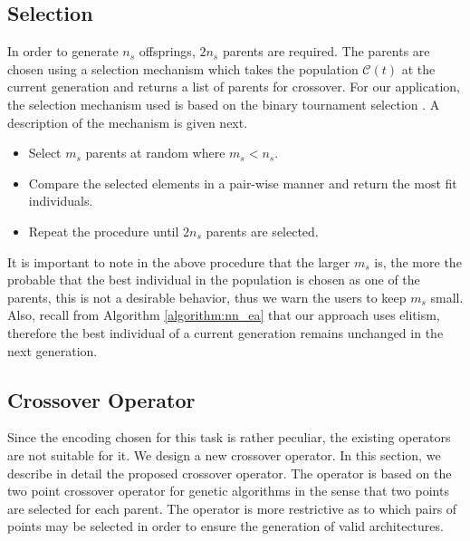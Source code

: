 \documentclass[12pt]{elsart}%
\begin{document}
\subsection{Selection}
\label{sec:selection}

In order to generate $n_s$ offsprings, $2n_s$ parents are required. The parents are chosen using a selection mechanism which takes the population $\mathcal{C}(t)$ at the current generation and returns a list of parents for crossover. For our application, the selection mechanism used is based on the binary tournament selection \cite{Engelbrecht2007,Krishnakumar1989}. A description of the mechanism is given next.

\begin{itemize}
\item Select $m_s$ parents at random where $m_s < n_s$.
\item Compare the selected elements in a pair-wise manner and return the most fit individuals.
\item Repeat the procedure until $2n_s$ parents are selected.
\end{itemize}

It is important to note in the above procedure that the larger $m_s$ is, the more the probable that the best individual in the population is chosen as one of the parents, this is not a desirable behavior, thus we warn the users to keep $m_s$ small. Also, recall from Algorithm \ref{algorithm:nn_ea} that our approach uses elitism, therefore the best individual of a current generation remains unchanged in the next generation.

\subsection{Crossover Operator}
\label{sec:crossover}

Since the encoding chosen for this task is rather peculiar, the existing operators are not suitable for it. We design a new crossover operator. In this section, we describe in detail the proposed crossover operator. The operator is based on the two point crossover operator for genetic algorithms \cite{holland1992} in the sense that two points are selected for each parent. The operator is more restrictive as to which pairs of points may be selected in order to ensure the generation of valid architectures. 
\end{document}
